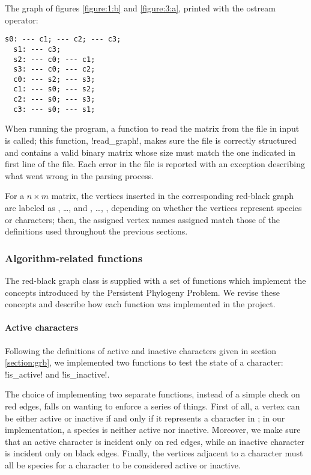 The graph \grb{} of figures \ref{figure:1:b} and \ref{figure:3:a}, printed with the ostream operator:

\begin{lstlisting}[keywordstyle=\color{block_fg}]
  s0: --- c1; --- c2; --- c3;
  s1: --- c3;
  s2: --- c0; --- c1;
  s3: --- c0; --- c2;
  c0: --- s2; --- s3;
  c1: --- s0; --- s2;
  c2: --- s0; --- s3;
  c3: --- s0; --- s1;
\end{lstlisting}

When running the program, a function to read the matrix from the file in input is called; this function, !read_graph!, makes sure the file is correctly structured and contains a valid binary matrix whose size must match the one indicated in first line of the file.
Each error in the file is reported with an exception describing what went wrong in the parsing process.

For a $n \times m$ matrix, the vertices inserted in the corresponding red-black graph \grb{} are labeled as \species[0], \dots, \species[n-1] and \character[0], \dots, \character[m-1], depending on whether the vertices represent species or characters; then, the assigned vertex names assigned match those of the definitions used throughout the previous sections.

\subsubsection*{Algorithm-related functions}

The red-black graph class is supplied with a set of functions which implement the concepts introduced by the Persistent Phylogeny Problem.
We revise these concepts and describe how each function was implemented in the project.

\paragraph{Active characters}

Following the definitions of active and inactive characters given in section \ref{section:grb}, we implemented two functions to test the state of a character: !is_active! and !is_inactive!.

The choice of implementing two separate functions, instead of a simple check on red edges, falls on wanting to enforce a series of things.
First of all, a vertex can be either active or inactive if and only if it represents a character in \grb{}; in our implementation, a species is neither active nor inactive.
Moreover, we make sure that an active character is incident only on red edges, while an inactive character is incident only on black edges.
Finally, the vertices adjacent to a character must all be species for a character to be considered active or inactive.

